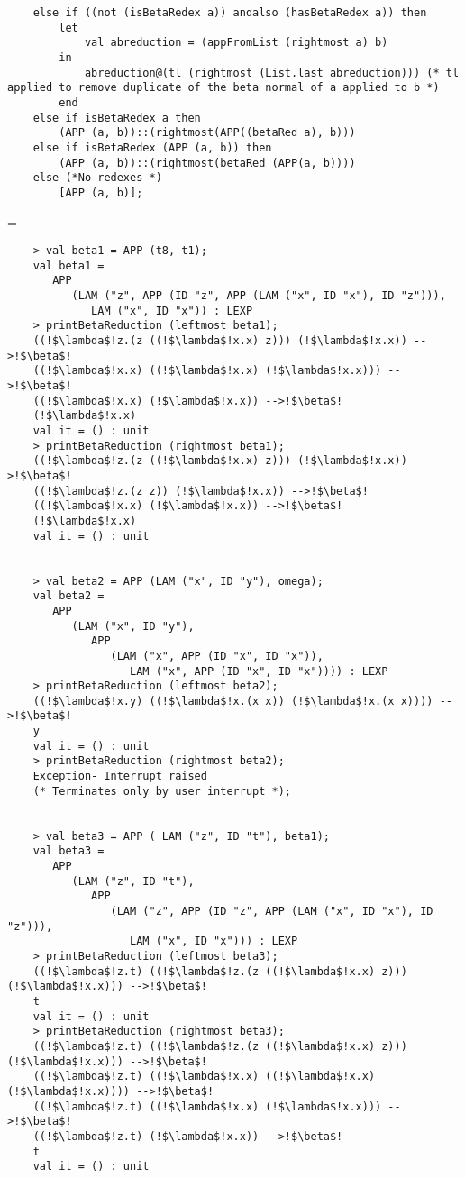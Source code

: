 \documentclass[11pt]{article}
\newenvironment{neverbreak} %
{\par\nobreak\vfil\penalty0\vfilneg
	\vtop\bgroup}
{\par\xdef\tpd{\the\prevdepth}\egroup
	\prevdepth=\tpd}
\begin{document}
\begin{enumerate}
\begin{neverbreak}
\begin{verbatim}
	else if ((not (isBetaRedex a)) andalso (hasBetaRedex a)) then
		let
			val abreduction = (appFromList (rightmost a) b)
		in
			abreduction@(tl (rightmost (List.last abreduction))) (* tl applied to remove duplicate of the beta normal of a applied to b *)
		end
	else if isBetaRedex a then
		(APP (a, b))::(rightmost(APP((betaRed a), b)))
	else if isBetaRedex (APP (a, b)) then
		(APP (a, b))::(rightmost(betaRed (APP(a, b))))
	else (*No redexes *)
		[APP (a, b)];
\end{verbatim}
\end{neverbreak}
\vspace{1cm}
\begin{verbatim}
	> val beta1 = APP (t8, t1);
	val beta1 =
	   APP
	      (LAM ("z", APP (ID "z", APP (LAM ("x", ID "x"), ID "z"))),
	         LAM ("x", ID "x")) : LEXP 
	> printBetaReduction (leftmost beta1);
	((!$\lambda$!z.(z ((!$\lambda$!x.x) z))) (!$\lambda$!x.x)) -->!$\beta$!
	((!$\lambda$!x.x) ((!$\lambda$!x.x) (!$\lambda$!x.x))) -->!$\beta$!
	((!$\lambda$!x.x) (!$\lambda$!x.x)) -->!$\beta$!
	(!$\lambda$!x.x)
	val it = () : unit
	> printBetaReduction (rightmost beta1);
	((!$\lambda$!z.(z ((!$\lambda$!x.x) z))) (!$\lambda$!x.x)) -->!$\beta$!
	((!$\lambda$!z.(z z)) (!$\lambda$!x.x)) -->!$\beta$!
	((!$\lambda$!x.x) (!$\lambda$!x.x)) -->!$\beta$!
	(!$\lambda$!x.x)
	val it = () : unit
	
	
	> val beta2 = APP (LAM ("x", ID "y"), omega);
	val beta2 =
	   APP
	      (LAM ("x", ID "y"),
	         APP
	            (LAM ("x", APP (ID "x", ID "x")),
	               LAM ("x", APP (ID "x", ID "x")))) : LEXP
	> printBetaReduction (leftmost beta2);
	((!$\lambda$!x.y) ((!$\lambda$!x.(x x)) (!$\lambda$!x.(x x)))) -->!$\beta$!
	y
	val it = () : unit
	> printBetaReduction (rightmost beta2);
	Exception- Interrupt raised 
	(* Terminates only by user interrupt *);
	
	
	> val beta3 = APP ( LAM ("z", ID "t"), beta1);
	val beta3 =
	   APP
	      (LAM ("z", ID "t"),
	         APP
	            (LAM ("z", APP (ID "z", APP (LAM ("x", ID "x"), ID "z"))),
	               LAM ("x", ID "x"))) : LEXP
	> printBetaReduction (leftmost beta3);
	((!$\lambda$!z.t) ((!$\lambda$!z.(z ((!$\lambda$!x.x) z))) (!$\lambda$!x.x))) -->!$\beta$!
	t
	val it = () : unit
	> printBetaReduction (rightmost beta3);
	((!$\lambda$!z.t) ((!$\lambda$!z.(z ((!$\lambda$!x.x) z))) (!$\lambda$!x.x))) -->!$\beta$!
	((!$\lambda$!z.t) ((!$\lambda$!x.x) ((!$\lambda$!x.x) (!$\lambda$!x.x)))) -->!$\beta$!
	((!$\lambda$!z.t) ((!$\lambda$!x.x) (!$\lambda$!x.x))) -->!$\beta$!
	((!$\lambda$!z.t) (!$\lambda$!x.x)) -->!$\beta$!
	t
	val it = () : unit
\end{verbatim}

\end{enumerate}
\newpage
\end{document}
